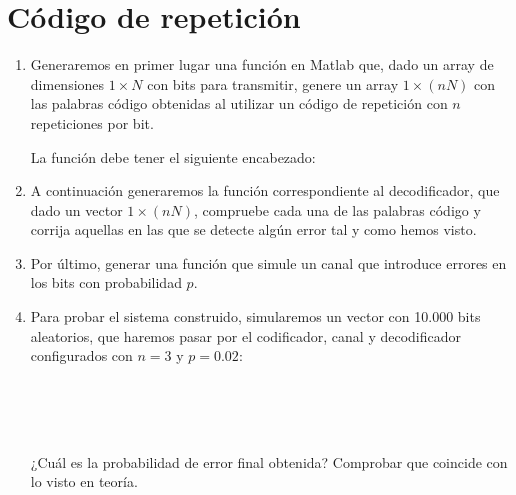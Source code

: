 \documentclass[es,practica]{uah}
\begin{document}

\maketitle

\section{Código de repetición}

	\begin{enumerate}
	\item \textrm{Generaremos en primer lugar una función en Matlab que, dado un array de dimensiones $1 \times N$ con bits para transmitir, genere un array $1 \times (n N)$ con las palabras código obtenidas al utilizar un código de repetición con $n$ repeticiones por bit.}

		\textrm{La función debe tener el siguiente encabezado:}
		

	\item \textrm{A continuación generaremos la función correspondiente al decodificador, que dado un vector $1 \times (n N)$, compruebe cada una de las palabras código y corrija aquellas en las que se detecte algún error tal y como hemos visto.}
	

	\item \textrm{Por último, generar una función que simule un canal que introduce errores en los bits con probabilidad $p$.} 
	
			
	\item \textrm{Para probar el sistema construido, simularemos un vector con 10.000 bits aleatorios, que haremos pasar por el codificador, canal y decodificador configurados con $n=3$ y $p=0.02$:}
	
 		\\
		\\
		\\
	
		\textrm{¿Cuál es la probabilidad de error final obtenida? Comprobar que coincide con lo visto en teoría. }
	
\end{enumerate}
\end{document}
